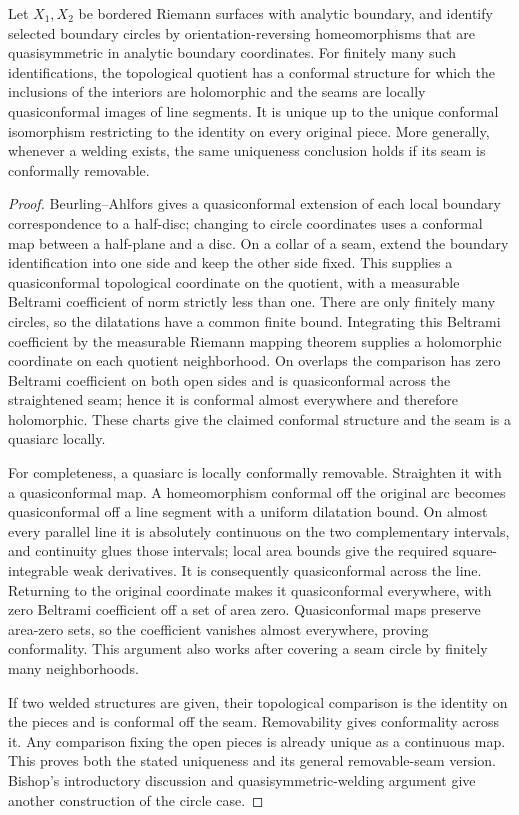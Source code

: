 \begin{theorem}\label{A3-welding}
Let $X_1,X_2$ be bordered Riemann surfaces with analytic boundary, and identify selected boundary circles by orientation-reversing homeomorphisms that are quasisymmetric in analytic boundary coordinates. For finitely many such identifications, the topological quotient has a conformal structure for which the inclusions of the interiors are holomorphic and the seams are locally quasiconformal images of line segments. It is unique up to the unique conformal isomorphism restricting to the identity on every original piece. More generally, whenever a welding exists, the same uniqueness conclusion holds if its seam is conformally removable.
\end{theorem}
\begin{proof}
Beurling--Ahlfors \cite[Theorem 1, p.~126]{ABeurlingAhlfors1956} gives a quasiconformal extension of each local boundary correspondence to a half-disc; changing to circle coordinates uses a conformal map between a half-plane and a disc. On a collar of a seam, extend the boundary identification into one side and keep the other side fixed. This supplies a quasiconformal topological coordinate on the quotient, with a measurable Beltrami coefficient of norm strictly less than one. There are only finitely many circles, so the dilatations have a common finite bound. Integrating this Beltrami coefficient by the measurable Riemann mapping theorem supplies a holomorphic coordinate on each quotient neighborhood. On overlaps the comparison has zero Beltrami coefficient on both open sides and is quasiconformal across the straightened seam; hence it is conformal almost everywhere and therefore holomorphic. These charts give the claimed conformal structure and the seam is a quasiarc locally.

For completeness, a quasiarc is locally conformally removable. Straighten it with a quasiconformal map. A homeomorphism conformal off the original arc becomes quasiconformal off a line segment with a uniform dilatation bound. On almost every parallel line it is absolutely continuous on the two complementary intervals, and continuity glues those intervals; local area bounds give the required square-integrable weak derivatives. It is consequently quasiconformal across the line. Returning to the original coordinate makes it quasiconformal everywhere, with zero Beltrami coefficient off a set of area zero. Quasiconformal maps preserve area-zero sets, so the coefficient vanishes almost everywhere, proving conformality. This argument also works after covering a seam circle by finitely many neighborhoods.

If two welded structures are given, their topological comparison is the identity on the pieces and is conformal off the seam. Removability gives conformality across it. Any comparison fixing the open pieces is already unique as a continuous map. This proves both the stated uniqueness and its general removable-seam version. Bishop's introductory discussion and quasisymmetric-welding argument \cite[Sections 1 and 4, pp.~613--615 and 630--632]{ABishop2007} give another construction of the circle case.
\end{proof}

